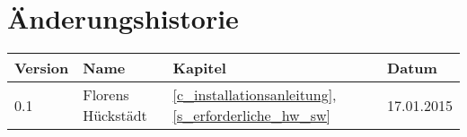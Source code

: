 %
%

\noindent
\chapter*{Änderungshistorie}
\begin{tabularx}{\textwidth}{|l|X|l|l|} \hline
       \textbf{Version}  	& \textbf{Name}   	& \textbf{Kapitel}  & \textbf{Datum}\\ \hline
       0.1           		& Florens Hückstädt & \ref{c_installationsanleitung}, \ref{s_erforderliche_hw_sw} 		& 17.01.2015\\
        \hline
\end{tabularx}